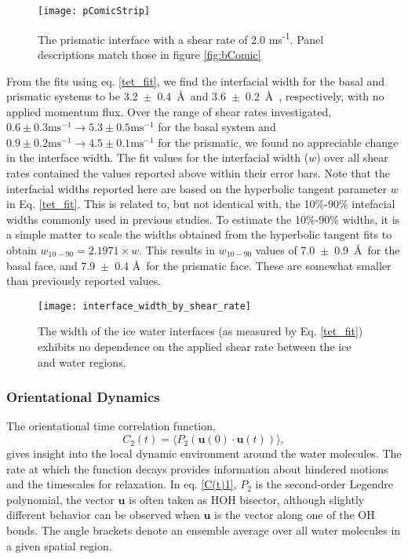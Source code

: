 \documentclass[11pt]{article}
\begin{document}
\begin{doublespace}
\begin{figure}
\texttt{[image: pComicStrip]}
\caption{\label{fig:pComic} The prismatic interface with a shear rate
  of 2.0 ms\textsuperscript{-1}.  Panel
  descriptions match those in figure \ref{fig:bComic}}
\end{figure}

From the fits using eq. \eqref{tet_fit}, we find the interfacial width
for the basal and prismatic systems to be 3.2~$\pm$~0.4~\AA\ and
3.6~$\pm$~0.2~\AA\ , respectively, with no applied momentum flux. Over
the range of shear rates investigated, $0.6 \pm 0.3 \mathrm{ms}^{-1}
\rightarrow 5.3 \pm 0.5 \mathrm{ms}^{-1}$ for the basal system and
$0.9 \pm 0.2 \mathrm{ms}^{-1} \rightarrow 4.5 \pm 0.1
\mathrm{ms}^{-1}$ for the prismatic, we found no appreciable change in
the interface width. The fit values for the interfacial width ($w$)
over all shear rates contained the values reported above within their
error bars.  Note that the interfacial widths reported here are based
on the hyperbolic tangent parameter $w$ in Eq. \ref{tet_fit}.  This is
related to, but not identical with, the 10\%-90\% intefacial widths
commonly used in previous studies.\cite{Bryk02,Bryk2004b} To estimate
the 10\%-90\% widths, it is a simple matter to scale the widths
obtained from the hyperbolic tangent fits to obtain $w_{10-90} =
2.1971 \times w$.\cite{Bryk02,Bryk2004b} This results in $w_{10-90}$
values of 7.0~$\pm$~0.9~\AA\ for the basal face, and 7.9~$\pm$~0.4
\AA\ for the prismatic face.  These are somewhat smaller than
previously reported values.

\begin{figure}
\texttt{[image: interface\_width\_by\_shear\_rate]}
\caption{\label{fig:widthByShear} The width of the ice water
  interfaces (as measured by Eq. \ref{tet_fit}) exhibits no dependence
  on the applied shear rate between the ice and water regions.}
\end{figure}



\subsubsection{Orientational Dynamics}
The orientational time correlation function,
\begin{equation}\label{C(t)1}
  C_{2}(t)=\langle P_{2}(\mathbf{u}(0) \cdot \mathbf{u}(t)) \rangle,
\end{equation}
gives insight into the local dynamic environment around the water
molecules.  The rate at which the function decays provides information
about hindered motions and the timescales for relaxation.  In
eq. \eqref{C(t)1}, $P_{2}$ is the second-order Legendre polynomial,
the vector $\mathbf{u}$ is often taken as HOH bisector, although
slightly different behavior can be observed when $\mathbf{u}$ is the
vector along one of the OH bonds.  The angle brackets denote an
ensemble average over all water molecules in a given spatial region.


\end{doublespace}
\end{document}

